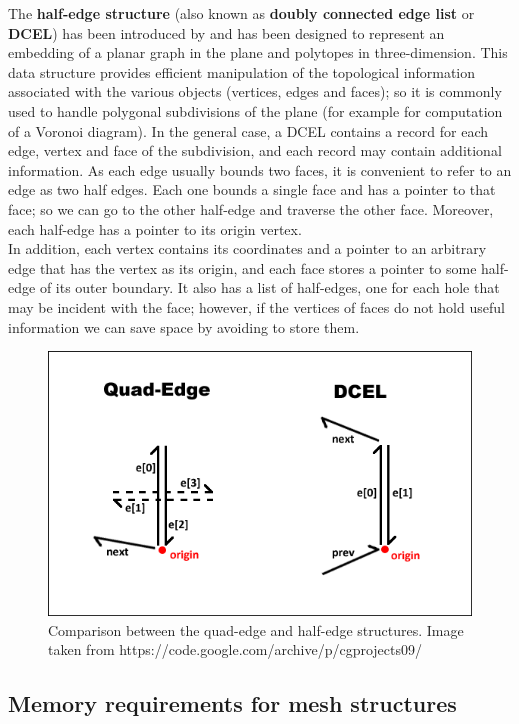 The \textbf{half-edge structure} (also known as \textbf{doubly connected edge list} or \textbf{DCEL}) has been introduced by \cite{Muller} and has been designed to represent an embedding of a planar graph in the plane and polytopes in three-dimension. This data structure provides efficient manipulation of the topological information associated with the various objects (vertices, edges and faces); so it is commonly used to handle polygonal subdivisions of the plane (for example for computation of a Voronoi diagram). In the general case, a DCEL contains a record for each edge, vertex and face of the subdivision, and each record may contain additional information. As each edge usually bounds two faces, it is convenient to refer to an edge as two half edges. Each one bounds a single face and has a pointer to that face; so we can go to the other half-edge and traverse the other face. Moreover, each half-edge has a pointer to its origin vertex.\\
In addition, each vertex contains its coordinates and a pointer to an arbitrary edge that has the vertex as its origin, and each face stores a pointer to some half-edge of its outer boundary. It also has a list of half-edges, one for each hole that may be incident with the face; however, if the vertices of faces do not hold useful information we can save space by avoiding to store them.

\begin{figure}[htb] %
   \centering
   \includegraphics[width=0.60\linewidth]{images/dcel-quadedge.png}
   \caption[Comparison between the quad-edge and half-edge structures]{Comparison between the quad-edge and half-edge structures. Image taken from https://code.google.com/archive/p/cgprojects09/}
   \label{fig:dcel-quadedge}
\end{figure}

\subsection{Memory requirements for mesh structures}\label{sec14:MemoryReq}

